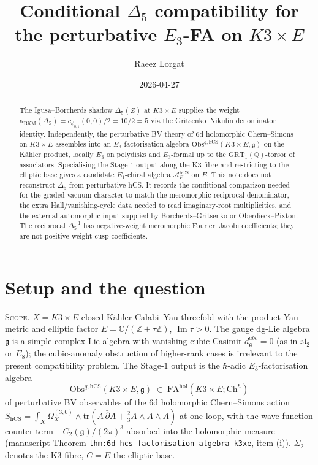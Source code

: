 \documentclass[11pt]{amsart}
\title{Conditional $\Delta_{5}$ compatibility for the perturbative $E_{3}$-FA on
$K3\times E$}
\author{Raeez Lorgat}
\date{2026-04-27}
\providecommand{\C}{\mathbb{C}}
\providecommand{\Z}{\mathbb{Z}}
\providecommand{\Q}{\mathbb{Q}}
\providecommand{\cA}{\mathcal{A}}
\providecommand{\dbar}{\bar{\partial}}
\providecommand{\frakg}{\mathfrak{g}}
\providecommand{\fsl}{\mathfrak{sl}}
\providecommand{\tr}{\mathrm{tr}}
\providecommand{\Obs}{\mathrm{Obs}}
\providecommand{\hCS}{\mathrm{hCS}}
\providecommand{\Eone}{E_{1}}
\providecommand{\Ethree}{E_{3}}
\providecommand{\kBKM}{\kappa_{\mathrm{BKM}}}
\providecommand{\Im}{\operatorname{Im}}
\theoremstyle{plain}
\theoremstyle{definition}
\theoremstyle{remark}
\begin{document}
\maketitle

\begin{abstract}
The Igusa--Borcherds shadow $\Delta_{5}(Z)$ at $K3\times E$ supplies the
weight $\kBKM(\Delta_{5})=c_{\phi_{0,1}}(0,0)/2=10/2=5$ via the
Gritsenko--Nikulin denominator identity. Independently, the perturbative
BV theory of $6$d holomorphic Chern--Simons on $K3\times E$ assembles
into an $\Ethree$-factorisation algebra
$\Obs^{q,\hCS}(K3\times E,\frakg)$ on the K\"ahler product, locally $E_3$
on polydisks and $E_3$-formal up to the $\mathrm{GRT}_{1}(\Q)$-torsor of
associators. Specialising the Stage-$1$ output along the K3 fibre and
restricting to the elliptic base gives a candidate $\Eone$-chiral
algebra $\cA_{E}^{\hCS}$ on $E$. This note does not reconstruct
$\Delta_{5}$ from perturbative hCS. It records the conditional
comparison needed for the graded vacuum character to match the
meromorphic reciprocal denominator, the extra Hall/vanishing-cycle data
needed to read imaginary-root multiplicities, and the external
automorphic input supplied by Borcherds--Gritsenko or
Oberdieck--Pixton. The reciprocal $\Delta_5^{-1}$ has negative-weight
meromorphic Fourier--Jacobi coefficients; they are not positive-weight
cusp coefficients.
\end{abstract}

\section{Setup and the question}
\label{sec:setup}

\textsc{Scope.} $X = K3\times E$ closed K\"ahler Calabi--Yau threefold
with the product Yau metric and elliptic factor
$E = \C/(\Z+\tau\Z)$, $\Im\tau>0$. The gauge dg-Lie algebra $\frakg$ is
a simple complex Lie algebra with vanishing cubic Casimir
$d^{abc}_{\frakg}=0$ (as in $\fsl_{2}$ or $E_{8}$); the cubic-anomaly
obstruction of higher-rank cases is irrelevant to the present
compatibility problem. The Stage-$1$ output is the $\hbar$-adic
$\Ethree$-factorisation algebra
\[
\Obs^{q,\hCS}(K3\times E,\frakg) \;\in\;
\mathrm{FA}^{\mathrm{hol}}(K3\times E;\mathrm{Ch}^{\hbar})
\]
of perturbative BV observables of the $6$d holomorphic Chern--Simons
action $S_{\hCS}=\int_{X}\Omega_{X}^{(3,0)}\wedge\tr(A\,\dbar A
+\tfrac{2}{3}A\wedge A\wedge A)$ at one-loop, with the wave-function
counter-term $-C_{2}(\frakg)/(2\pi)^{3}$ absorbed into the
holomorphic measure (manuscript Theorem
\texttt{thm:6d-hcs-factorisation-algebra-k3xe}, item (i)). $\Sigma_{2}$
denotes the K3 fibre, $C=E$ the elliptic base.
\end{document}
